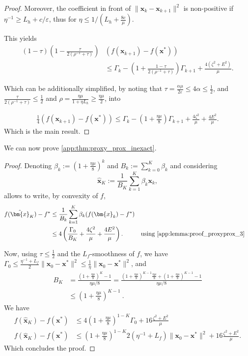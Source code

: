 \documentclass{article}
\def\eps{{\varepsilon}}
\def\vx{{\bm{x}}}
\theoremstyle{plain}
\theoremstyle{definition}
\theoremstyle{remark}
\begin{document}
\begin{proof}
Moreover, the coefficient in front of $\|\vx_k - \vx_{k+1}\|^2$ is non-positive if $\eta^{-1} \ge L_h + c/\eps$, thus for $\eta\le  1/(L_h + \frac{8c}{\mu})$.

This yields 
\begin{align*}
        \left(1 - \tau\right)\left(1 - \frac{\tau}{2(\rho^{-1} + \tau)}\right)&(f(\vx_{k+1}) - f(\vx^*)) \\
        &\le \Gamma_k - \left(1 +  \frac{1-\tau}{2(\rho^{-1} + \tau)}\right)\Gamma_{k+1} +  \frac{4(\zeta^2 +E^2)}{\mu}.
\end{align*}

Which can be additionally simplified, by noting that $\tau = \frac{\alpha \mu}{2\eps} \le 4 \alpha \le \frac{1}{2}$, and \(\frac{\tau}{2(\rho^{-1} + \tau)} \le \frac{1}{2}\) and $\rho = \frac{\eta \mu}{1+\eta L_h} \ge \frac{\eta\mu}{2}$, into

\begin{align*}
        \frac{1}{4}(f(\vx_{k+1}) - f(\vx^*)) 
        \le \Gamma_k - \left(1 +  \frac{\eta \mu}{8}\right)\Gamma_{k+1} + \frac{4\zeta^2}{\mu} + \frac{4E^2}{\mu}.
\end{align*}
Which is the main result.

\end{proof}


We can now prove \cref{app:thm:proxy_prox_inexact}.

\begin{proof}

Denoting $\beta_k := \left(1 + \frac{\eta \mu}{8}\right)^k$ and $B_k := \sum_{k=0}^K \beta_k$ and considering
\[
\hat{\vx}_{K} := \frac{1}{B_K}\sum_{k=1}^K \beta_k \vx_k,
\]
allows to write, by convexity of $f$,
\begin{align*}
    f(\hat{\vx}_K) - f^* &\le \frac{1}{B_k}\sum_{k=1}^K \beta_k (f(\vx_k) - f^*)\\
    &\le 4\left(\frac{\Gamma_{0}}{B_K} + \frac{4\zeta^2}{\mu} + \frac{4E^2}{\mu}\right). &&\text{using \cref{app:lemma:proof_proxyprox_3}}
\end{align*}

Now, using $ \tau \le \frac{1}{2}$ and the $L_f$-smoothness of $f$, we have $\Gamma_{0} \le \frac{\eta^{-1} + L_f}{2}\|\vx_0 - \vx^*\|^2 \le \frac{1}{\eta}\|\vx_0 - \vx^*\|^2$, and
\begin{align*}
    B_K &= \frac{(1+\frac{\eta \mu}{8})^K - 1}{\eta \mu /8} = \frac{(1+\frac{\eta \mu}{8})^{K-1}\frac{\eta \mu}{8} + (1+\frac{\eta \mu}{8})^{K-1} - 1}{\eta \mu /8}\\
    & \le \left(1 + \frac{\eta \mu }{8}\right)^{K-1} \ .
\end{align*}
We have 
\begin{align*}
f(\hat\vx_{K}) - f(\vx^*) &\le 4\left(1 + \frac{\eta \mu}{8}\right)^{1-K}\Gamma_0 + 16\frac{\zeta^2 + E^2}{\mu} \\
f(\hat\vx_{K}) - f(\vx^*) &\le \left(1 + \frac{\eta \mu}{8}\right)^{1-K}2(\eta^{-1} + L_f)\|\vx_0 - \vx^*\|^2 + 16\frac{\zeta^2 + E^2}{\mu}.
\end{align*}
Which concludes the proof.
\end{proof}
\end{document}
